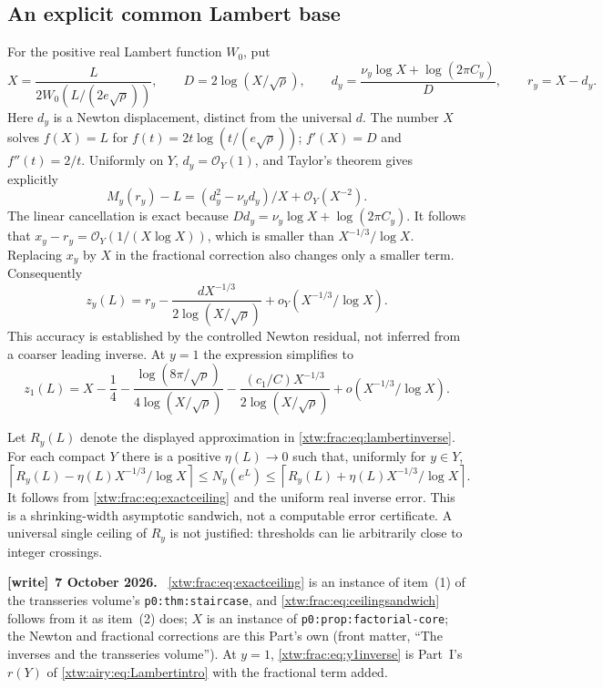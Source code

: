 \documentclass[11pt]{article}
\theoremstyle{remark}\newtheorem{remark}[theorem]{Remark}
\newcommand{\OO}{\mathcal O}
\newcommand{\ceil}[1]{\left\lceil #1\right\rceil}
\newcommand{\file}[1]{\nolinkurl{#1}}
\newenvironment{writenote}[1][]{\par\smallskip\begingroup\small
 \noindent\textbf{[write]}\if\relax\detokenize{#1}\relax\else~\textbf{#1.}\fi\ }%
 {\par\endgroup\smallskip}
\begin{document}
\subsection{An explicit common Lambert base}
For the positive real Lambert function $W_0$, put
\begin{equation}\label{xtw:frac:eq:lambert}
 X=\frac{L}{2W_0(L/(2e\sqrt\rho))},\qquad
 D=2\log(X/\sqrt\rho),\qquad
 d_y=\frac{\nu_y\log X+\log(2\pi C_y)}{D},\qquad r_y=X-d_y.
\end{equation}
Here $d_y$ is a Newton displacement, distinct from the universal $d$.
The number $X$ solves $f(X)=L$ for
$f(t)=2t\log(t/(e\sqrt\rho))$; $f'(X)=D$ and $f''(t)=2/t$.
Uniformly on $Y$, $d_y=\OO_Y(1)$, and Taylor's theorem gives explicitly
\[
 M_y(r_y)-L=(d_y^2-\nu_y d_y)/X+\OO_Y(X^{-2}).
\]
The linear cancellation is exact because
$Dd_y=\nu_y\log X+\log(2\pi C_y)$.
It follows that $x_y-r_y=\OO_Y(1/(X\log X))$, which is smaller than
$X^{-1/3}/\log X$. Replacing $x_y$ by $X$ in the fractional correction
also changes only a smaller term. Consequently
\begin{equation}\label{xtw:frac:eq:lambertinverse}
 z_y(L)=r_y-\frac{dX^{-1/3}}{2\log(X/\sqrt\rho)}
                          +o_Y(X^{-1/3}/\log X).
\end{equation}
This accuracy is established by the controlled Newton residual, not
inferred from a coarser leading inverse.
At $y=1$ the expression simplifies to
\begin{equation}\label{xtw:frac:eq:y1inverse}
 z_1(L)=X-\frac14-\frac{\log(8\pi/\sqrt\rho)}{4\log(X/\sqrt\rho)}
       -\frac{(c_1/C)X^{-1/3}}{2\log(X/\sqrt\rho)}
                   +o(X^{-1/3}/\log X).
\end{equation}

Let $R_y(L)$ denote the displayed approximation in
\eqref{xtw:frac:eq:lambertinverse}. For each compact $Y$ there is a positive
$\eta(L)\to0$ such that, uniformly for $y\in Y$,
\begin{equation}\label{xtw:frac:eq:ceilingsandwich}
 \ceil{R_y(L)-\eta(L)X^{-1/3}/\log X}
 \le N_y(e^L)\le
 \ceil{R_y(L)+\eta(L)X^{-1/3}/\log X}.
\end{equation}
It follows from \eqref{xtw:frac:eq:exactceiling} and the uniform real inverse error.
This is a shrinking-width asymptotic sandwich, not a computable error
certificate. A universal single ceiling of $R_y$ is not justified:
thresholds can lie arbitrarily close to integer crossings.
\begin{writenote}[7 October 2026]
\eqref{xtw:frac:eq:exactceiling} is an instance of item~(1) of the transseries volume's \file{p0:thm:staircase}, and \eqref{xtw:frac:eq:ceilingsandwich} follows from it as item~(2) does; $X$ is an instance of \file{p0:prop:factorial-core}; the Newton and fractional corrections are this Part's own (front matter, ``The inverses and the transseries volume''). At $y=1$, \eqref{xtw:frac:eq:y1inverse} is Part~I's $r(Y)$ of \eqref{xtw:airy:eq:Lambertintro} with the fractional term added.
\end{writenote}
\end{document}
